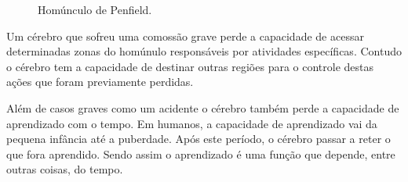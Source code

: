 \begin{figure}[H]
	\centering
	\setlength{\fboxsep}{8pt}
	\setlength{\fboxrule}{0.1pt}
	\caption{Homúnculo de Penfield.}
	\label{homunculo}
\end{figure}

Um cérebro que sofreu uma comossão grave perde a capacidade de acessar
determinadas zonas do homúnulo responsáveis por atividades específicas. Contudo
o cérebro tem a capacidade de destinar outras regiões para o controle destas
ações que foram previamente perdidas.

Além de casos graves como um acidente o cérebro também perde a capacidade de
aprendizado com o tempo. Em humanos, a capacidade de aprendizado vai da pequena
infância até a puberdade. Após este período, o cérebro passar a reter o que fora
aprendido. Sendo assim o aprendizado é uma função que depende, entre outras
coisas, do tempo.
